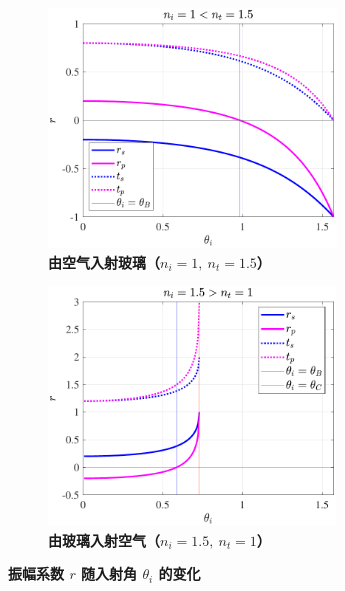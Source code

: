 \documentclass[UTF8]{report}
\theoremstyle{MyLineTheoremStyle} %
\theoremstyle{MyBlockTheoremStyle} %
\theoremstyle{MySubsubsectionStyle} %
\begin{document}
\begin{figure}[H]\centering
\begin{subfigure}[t]{0.49\textwidth}\centering
    \includegraphics[height=180pt]{assets/2/2024-09-15_10-53-31.pdf}
    \caption{\bfseries 由空气入射玻璃（$n_i = 1,\ n_t = 1.5$） }
\end{subfigure}
\begin{subfigure}[t]{0.49\textwidth}\centering
    \includegraphics[height=180pt]{assets/2/2024-09-15_10-53-27.pdf}
    \caption{\bfseries 由玻璃入射空气（$n_i = 1.5,\ n_t = 1$） }
\end{subfigure}
\caption{\bfseries 振幅系数 $r$ 随入射角 $\theta_i$ 的变化 }\label{振幅系数随入射角的变化}
\end{figure}
\end{document}
